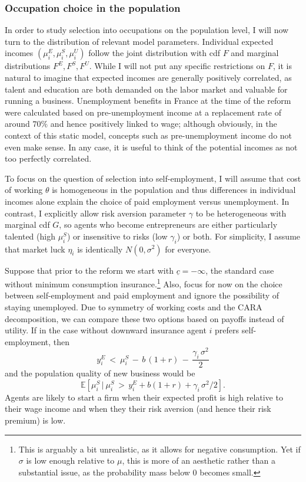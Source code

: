 \subsubsection*{Occupation choice in the population}

In order to study selection into occupations on the population level, I will now turn to the distribution of relevant model parameters. Individual expected incomes $(\mu_i^E, \mu_i^S, \mu_i^U)$ follow the joint distribution with cdf $F$ and marginal distributions $F^E, F^S, F^U$. While I will not put any specific restrictions on $F$, it is natural to imagine that expected incomes are generally positively correlated, as talent and education are both demanded on the labor market and valuable for running a business. Unemployment benefits in France at the time of the reform were calculated based on pre-unemployment income at a replacement rate of around $70\%$ and hence positively linked to wage; although obviously, in the context of this static model, concepts such as pre-unemployment income do not even make sense. In any case, it is useful to think of the potential incomes as not too perfectly correlated. \newline

\noindent To focus on the question of selection into self-employment, I will assume that  cost of working $\theta$ is homogeneous in the population and thus differences in individual incomes alone explain the choice of paid employment versus unemployment. In contrast, I explicitly allow risk aversion parameter $\gamma$ to be heterogeneous with marginal cdf $G$, so agents who become entrepreneurs are either particularly talented (high $\mu_i^S$) or insensitive to risks (low $\gamma_i$) or both. For simplicity, I assume that market luck $\eta_i$ is identically $N(0, \sigma^2)$ for everyone. \newline

\noindent Suppose that prior to the reform we start with $\underline{c} = - \infty$, the standard case without minimum consumption insurance.\footnote{This is arguably a bit unrealistic, as it allows for negative consumption. Yet if $\sigma$ is low enough relative to $\mu$, this is more of an aesthetic rather than a substantial issue, as the probability mass below $0$ becomes small.}
Also, focus for now on the choice between self-employment and paid employment and ignore the possibility of staying unemployed. Due to symmetry of working costs and the CARA decomposition, we can compare these two options based on payoffs instead of utility. If in the case without downward insurance agent $i$ prefers self-employment, then 
\begin{equation}
y^E_i \:  < \:  \mu^S_i \, - \,  b \, (1+r) \, - \, \frac{\gamma_i \, \sigma^2}{2}
\end{equation} 
and the population quality of new business would be 
\begin{equation}
\mathbb{E}\left[\mu_i^S \, | \: \mu_i^S \, > \, y_i^E + b(1+r) + \gamma_i \, \sigma^2 / 2\right].
\end{equation}
Agents are likely to start a firm when their expected profit is high relative to their wage income and when they their risk aversion (and hence their risk premium) is low. 

